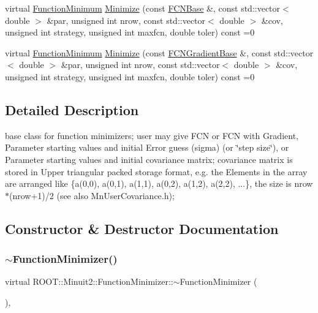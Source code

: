 \begin{DoxyCompactItemize}
\item 
virtual \mbox{\hyperlink{classROOT_1_1Minuit2_1_1FunctionMinimum}{Function\+Minimum}} \mbox{\hyperlink{classROOT_1_1Minuit2_1_1FunctionMinimizer_a22d44dc8c018424a98ce8928ee7c5613}{Minimize}} (const \mbox{\hyperlink{classROOT_1_1Minuit2_1_1FCNBase}{F\+C\+N\+Base}} \&, const std\+::vector$<$ double $>$ \&par, unsigned int nrow, const std\+::vector$<$ double $>$ \&cov, unsigned int strategy, unsigned int maxfcn, double toler) const =0
\item 
virtual \mbox{\hyperlink{classROOT_1_1Minuit2_1_1FunctionMinimum}{Function\+Minimum}} \mbox{\hyperlink{classROOT_1_1Minuit2_1_1FunctionMinimizer_a467a9dd60665c9b31969fe55d73b6401}{Minimize}} (const \mbox{\hyperlink{classROOT_1_1Minuit2_1_1FCNGradientBase}{F\+C\+N\+Gradient\+Base}} \&, const std\+::vector$<$ double $>$ \&par, unsigned int nrow, const std\+::vector$<$ double $>$ \&cov, unsigned int strategy, unsigned int maxfcn, double toler) const =0
\end{DoxyCompactItemize}


\subsection{Detailed Description}
base class for function minimizers; user may give F\+CN or F\+CN with Gradient, Parameter starting values and initial Error guess (sigma) (or \char`\"{}step size\char`\"{}), or Parameter starting values and initial covariance matrix; covariance matrix is stored in Upper triangular packed storage format, e.\+g. the Elements in the array are arranged like \{a(0,0), a(0,1), a(1,1), a(0,2), a(1,2), a(2,2), ...\}, the size is nrow$\ast$(nrow+1)/2 (see also Mn\+User\+Covariance.\+h); 

\subsection{Constructor \& Destructor Documentation}
\mbox{\label{classROOT_1_1Minuit2_1_1FunctionMinimizer_a804a5a18f04fce8e2fcbb37d2a1b714d}} 
\subsubsection{\texorpdfstring{$\sim$FunctionMinimizer()}{~FunctionMinimizer()}\hspace{0.1cm}{\footnotesize\ttfamily [1/3]}}
{\footnotesize\ttfamily virtual R\+O\+O\+T\+::\+Minuit2\+::\+Function\+Minimizer\+::$\sim$\+Function\+Minimizer (\begin{DoxyParamCaption}{ }\end{DoxyParamCaption})\hspace{0.3cm}{\ttfamily [inline]}, {\ttfamily [virtual]}}

